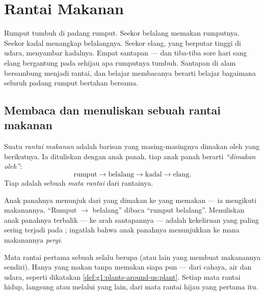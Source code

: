 \chapter{Rantai Makanan}\label{ch:g3:food-chains}

Rumput tumbuh di padang rumput. Seekor belalang memakan rumputnya.
Seekor kadal menangkap belalangnya. Seekor elang, yang berputar tinggi
di udara, menyambar kadalnya. Empat santapan --- dan tiba-tiba sore
hari sang elang bergantung pada sehijau apa rumputnya tumbuh. Santapan
di alam bersambung menjadi rantai, dan belajar membacanya berarti
belajar bagaimana seluruh padang rumput bertahan bersama.

\section{Membaca dan menuliskan sebuah rantai makanan}

\begin{definition}\label{def:g3:food-chains:chain}
Suatu \emph{rantai makanan} adalah barisan
 yang masing-masingnya dimakan oleh yang berikutnya. Ia
dituliskan dengan anak panah, tiap anak panah berarti \emph{``dimakan
oleh''}:
\[
\text{rumput} \longrightarrow \text{belalang}
\longrightarrow \text{kadal} \longrightarrow \text{elang}.
\]
Tiap  adalah sebuah \emph{mata rantai}
dari rantainya.
\end{definition}

\begin{remark}\label{rem:g3:food-chains:arrow}
Anak panahnya menunjuk dari yang dimakan ke yang memakan --- ia
mengikuti makanannya. ``Rumput $\rightarrow$ belalang'' dibaca
``rumput  belalang''. Menuliskan anak panahnya terbalik
--- ke arah santapannya --- adalah kekeliruan yang paling sering
terjadi pada ; ingatlah bahwa anak panahnya menunjukkan
ke mana makanannya \emph{pergi}.
\end{remark}

\begin{proposition}\label{prop:g3:food-chains:start}
Mata rantai pertama sebuah  selalu berupa  (atau
 lain yang membuat makanannya sendiri). Hanya 
yang makan tanpa memakan siapa pun --- dari cahaya, air dan udara,
seperti dikatakan \cref{def:g1:plants-around-us:plant}. Setiap mata
rantai  hidup, langsung atau melalui yang lain, dari mata rantai
hijau yang pertama itu.
\end{proposition}
\admitted

